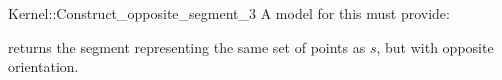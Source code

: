 \begin{ccRefFunctionObjectConcept}{Kernel::Construct_opposite_segment_3}
A model for this must provide:


{returns the segment representing the same set of points as $s$,
but with opposite orientation.}

\ccIsModel{}

\end{ccRefFunctionObjectConcept}
